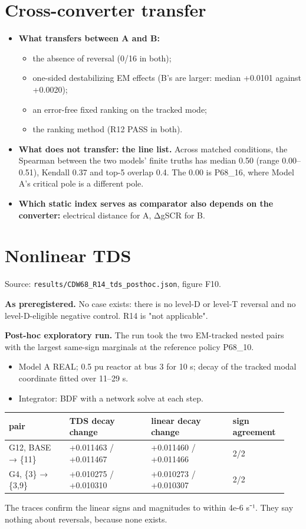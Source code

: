 \documentclass[10pt,a4paper]{article}
\begin{document}
\section{Cross-converter transfer}
\begin{itemize}
\item \textbf{What transfers between A and B:}
\begin{itemize}
\item the absence of reversal (0/16 in both);
\item one-sided destabilizing EM effects (B's are larger: median +0.0101 against +0.0020);
\item an error-free fixed ranking on the tracked mode;
\item the ranking method (R12 PASS in both).
\end{itemize}
\item \textbf{What does not transfer: the line list.} Across matched conditions, the Spearman between the two models' finite truths has median 0.50 (range 0.00–0.51), Kendall 0.37 and top-5 overlap 0.4. The 0.00 is P68\_16, where Model A's critical pole is a different pole.
\item \textbf{Which static index serves as comparator also depends on the converter:} electrical distance for A, ΔgSCR for B.
\end{itemize}
\section{Nonlinear TDS}
Source: \texttt{results/\allowbreak{}CDW68\_\allowbreak{}R14\_\allowbreak{}tds\_\allowbreak{}posthoc.json}, figure F10.

\textbf{As preregistered.} No case exists: there is no level-D or level-T reversal and no level-D-eligible negative control. R14 is "not applicable".

\textbf{Post-hoc exploratory run.} The run took the two EM-tracked nested pairs with the largest same-sign marginals at the reference policy P68\_10.

\begin{itemize}
\item Model A REAL; 0.5 pu reactor at bus 3 for 10 s; decay of the tracked modal coordinate fitted over 11–29 s.
\item Integrator: BDF with a network solve at each step.
\end{itemize}
{\small
\begin{longtable}{L{0.209\linewidth}L{0.274\linewidth}L{0.274\linewidth}L{0.183\linewidth}}
\toprule
\textbf{pair} & \textbf{TDS decay change} & \textbf{linear decay change} & \textbf{sign agreement} \\
\midrule
\endhead
G12, BASE → \{11\} & +0.011463 / +0.011467 & +0.011460 / +0.011466 & 2/2 \\
G4, \{3\} → \{3,9\} & +0.010275 / +0.010310 & +0.010273 / +0.010307 & 2/2 \\
\bottomrule
\end{longtable}}
The traces confirm the linear signs and magnitudes to within 4e-6 s⁻¹. They say nothing about reversals, because none exists.
\end{document}
